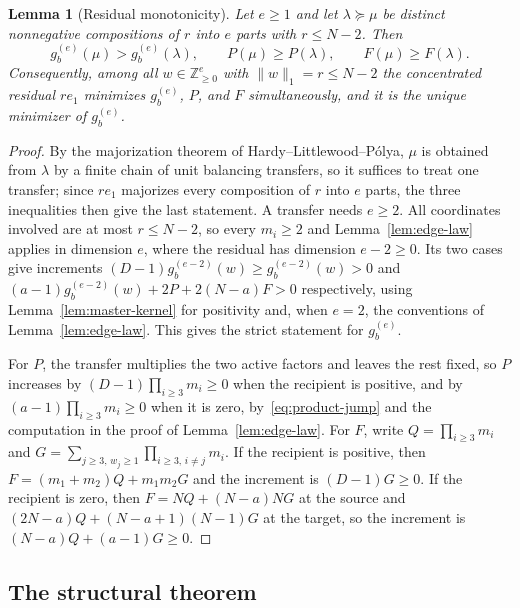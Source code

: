 \documentclass[pdflatex,sn-mathphys-num]{sn-jnl}
\theoremstyle{thmstyleone}
\newtheorem{lemma}[theorem]{Lemma}
\theoremstyle{thmstylethree}
\theoremstyle{thmstyletwo}
\newcommand{\Z}{\mathbb Z}
\begin{document}
\begin{lemma}[Residual monotonicity]
\label{lem:residual-monotone}
Let $e\ge1$ and let $\lambda\succeq\mu$ be distinct nonnegative compositions
of $r$ into $e$ parts with $r\le N-2$.  Then
\[
 g_b^{(e)}(\mu)>g_b^{(e)}(\lambda),\qquad
 P(\mu)\ge P(\lambda),\qquad
 F(\mu)\ge F(\lambda).
\]
Consequently, among all $w\in\Z_{\ge0}^e$ with $\|w\|_1=r\le N-2$ the
concentrated residual $re_1$ minimizes $g_b^{(e)}$, $P$, and $F$
simultaneously, and it is the unique minimizer of $g_b^{(e)}$.
\end{lemma}

\begin{proof}
By the majorization theorem of Hardy--Littlewood--P\'olya, $\mu$ is obtained
from $\lambda$ by a finite chain of unit balancing transfers, so it suffices
to treat one transfer; since $re_1$ majorizes every composition of $r$ into
$e$ parts, the three inequalities then give the last statement.  A transfer
needs $e\ge2$.  All coordinates involved are at most $r\le N-2$,
so every $m_i\ge2$ and Lemma~\ref{lem:edge-law} applies in dimension $e$,
where the residual has dimension $e-2\ge0$.  Its two cases give increments
$(D-1)g_b^{(e-2)}(w)\ge g_b^{(e-2)}(w)>0$ and
$(a-1)g_b^{(e-2)}(w)+2P+2(N-a)F>0$ respectively, using
Lemma~\ref{lem:master-kernel} for positivity and, when $e=2$, the
conventions of Lemma~\ref{lem:edge-law}.  This gives the strict statement for
$g_b^{(e)}$.

For $P$, the transfer multiplies the two active factors and leaves the rest
fixed, so $P$ increases by $(D-1)\prod_{i\ge3}m_i\ge0$ when the recipient is
positive, and by $(a-1)\prod_{i\ge3}m_i\ge0$ when it is zero,
by~\eqref{eq:product-jump} and the computation in the proof of
Lemma~\ref{lem:edge-law}.  For $F$, write $Q=\prod_{i\ge3}m_i$ and
$G=\sum_{j\ge3,\,w_j\ge1}\prod_{i\ge3,\,i\ne j}m_i$.  If the recipient is
positive, then $F=(m_1+m_2)Q+m_1m_2G$ and the increment is $(D-1)G\ge0$.  If
the recipient is zero, then $F=NQ+(N-a)NG$ at the source and
$(2N-a)Q+(N-a+1)(N-1)G$ at the target, so the increment is
$(N-a)Q+(a-1)G\ge0$.
\end{proof}

\subsection{The structural theorem}
\end{document}
